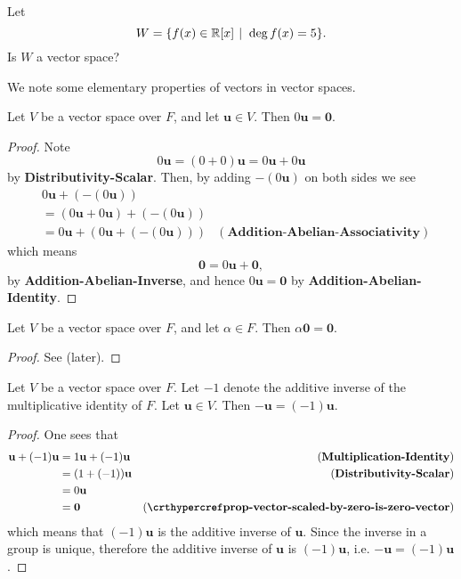 \begin{exercise}
    Let
    \[
        W = \{f(x) \in \R[x] \vert \deg f(x) = 5\}.
    \]
    Is $W$ a vector space?
\end{exercise}

We note some elementary properties of vectors in vector spaces.

\begin{proposition}\label{prop-vector-scaled-by-zero-is-zero-vector}
    Let $V$ be a vector space over $F$, and let $\mathbf{u} \in V$. Then $0\mathbf{u} = \mathbf{0}$.
\end{proposition}
\begin{proof}
    Note
    \[
        0\mathbf{u} = (0 + 0)\mathbf{u} = 0\mathbf{u} + 0\mathbf{u}
    \]
    by \textbf{Distributivity-Scalar}. Then, by adding $-(0\mathbf{u})$ on both sides we see
    \begin{align*}
        &0\mathbf{u} + (-(0\mathbf{u}))\\
        &= (0\mathbf{u} + 0\mathbf{u}) + (-(0\mathbf{u}))\\
        &= 0\mathbf{u} + (0\mathbf{u} + (-(0\mathbf{u}))) & (\textbf{Addition-Abelian-Associativity})
    \end{align*}
    which means
    \[
        \mathbf{0} = 0\mathbf{u} + \mathbf{0},
    \]
    by \textbf{Addition-Abelian-Inverse}, and hence $0\mathbf{u} = \mathbf{0}$ by \textbf{Addition-Abelian-Identity}.
\end{proof}

\begin{proposition}\label{prop-zero-vector-scaled-by-constant-is-zero-vector}
    Let $V$ be a vector space over $F$, and let $\alpha \in F$. Then $\alpha\mathbf{0} = \mathbf{0}$.
\end{proposition}
\begin{proof}
    See  (later).
\end{proof}

\begin{proposition}\label{prop-vector-inverse-is-negative-vector}
    Let $V$ be a vector space over $F$. Let $-1$ denote the additive inverse of the multiplicative identity of $F$. Let $\mathbf{u} \in V$. Then $-\mathbf{u} = (-1)\mathbf{u}$.
\end{proposition}
\begin{proof}
    One sees that
    \begin{align*}
        \mathbf{u} + (-1)\mathbf{u} &= 1\mathbf{u} + (-1)\mathbf{u} & (\textbf{Multiplication-Identity})\\
        &= (1 + (-1))\mathbf{u} & (\textbf{Distributivity-Scalar})\\
        &= 0\mathbf{u}\\
        &= \mathbf{0} & (\myref{prop-vector-scaled-by-zero-is-zero-vector})
    \end{align*}
    which means that $(-1)\mathbf{u}$ is the additive inverse of $\mathbf{u}$. Since the inverse in a group is unique, therefore the additive inverse of $\mathbf{u}$ is $(-1)\mathbf{u}$, i.e. $-\mathbf{u} = (-1)\mathbf{u}$.
\end{proof}


